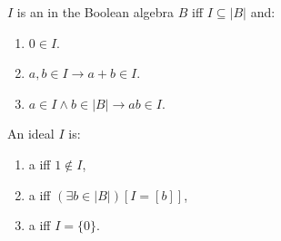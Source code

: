 $I$ is an  in the Boolean algebra $B$ iff $I \subseteq |B|$ and:
\begin{enumerate}
\item $0 \in I$.
\item $a, b \in I \rightarrow a + b \in I$.
\item $a \in I \land b \in |B| \rightarrow ab \in I$.
\end{enumerate}
An ideal $I$ is:
\begin{enumerate}
\item a  iff $1 \notin I$,
\item a  iff $(\exists b \in |B|)[I = [b]]$,
\item a  iff $I = \{0\}$.
\end{enumerate}
